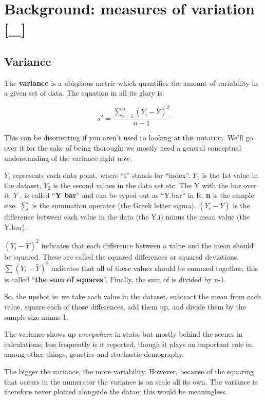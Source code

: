 \documentclass[]{book}
\theoremstyle{definition}
\theoremstyle{definition}
\theoremstyle{definition}
\theoremstyle{remark}
\begin{document}
\section{Background: measures of variation
{[}\_{]}}\label{background-measures-of-variation-_}

\subsection{Variance}\label{variance}

The \textbf{variance} is a ubiqitous metric which quantifies the amount
of variability in a given set of data. The equation in all its glory is:

\[s^2 = {\frac{\sum\limits_{i=1}^{n} \left(Y_{i} - \bar{Y}\right)^{2}} {n-1}}\]

This can be disorienting if you aren't used to looking at this notation.
We'll go over it for the sake of being thorough; we mostly need a
general conceptual understanding of the variance right now.

\(Y_{i}\) represents each data point, where ``i'' stands for ``index''.
\(Y_{1}\) is the 1st value in the dataset, \(Y_{2}\) is the second
values in the data set etc. The Y with the bar over it, \(\bar{Y}\) , is
called ``\textbf{Y bar}'' and can be typed out as ``Y.bar'' in R.
\textbf{n} is the sample size. \(\sum\) is the summation operator (the
Greek letter sigma). \(\left(Y_{i} - \bar{Y}\right)\) is the difference
between each value in the data (the Y.i) minus the mean value (the
Y.bar).

\((Y_{i} - \bar{Y})^{2}\) indicates that each difference between a value
and the mean should be squared. These are called the squared differences
or squared deviations. \(\sum(Y_{i} - \bar{Y})^{2}\) indicates that all
of these values should be summed together; this is called ``\textbf{the
sum of squares}''. Finally, the sum of is divided by n-1.

So, the upshot is: we take each value in the dataset, subtract the mean
from each value, square each of those differences, add them up, and
divide them by the sample size minus 1.

The variance shows up \emph{everywhere} in stats, but mostly behind the
scenes in calculations; less frequently is it reported, though it plays
an important role in, among other things, genetics and stochastic
demography.

The bigger the variance, the more variability. However, because of the
squaring that occurs in the numerator the variance is on scale all its
own. The variance is therefore never plotted alongside the datae; this
would be meaningless.
\end{document}
